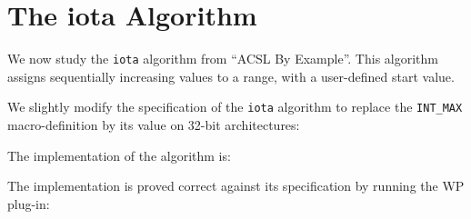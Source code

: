\clearpage
\section{The \textsf{iota} Algorithm}
\label{iota}

We now study the \texttt{iota} algorithm from ``ACSL By Example''.
This algorithm assigns sequentially increasing values to a range, with a
user-defined start value.

We slightly modify the specification of the \texttt{iota} algorithm 
to replace the \texttt{INT\_MAX} macro-definition by its value on 32-bit
architectures:


The implementation of the algorithm is:


The implementation is proved correct against its specification by
running the \textsf{WP} plug-in: 
